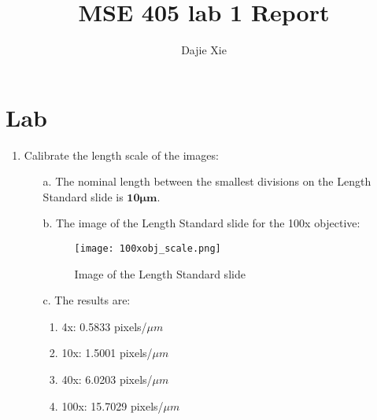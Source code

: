 \documentclass[12pt]{article}
\begin{document}
\title{\textbf{MSE 405 lab 1 Report}}
\author{Dajie Xie}

\maketitle

\section{Lab}

\begin{enumerate}
    \item Calibrate the length scale of the images:
    \begin{enumerate}
        \item[a.] The nominal length between the smallest divisions on the Length Standard slide is $\mathbf{10\bm{\mu} m}$. 
        
        \item[b.] The image of the Length Standard slide for the 100x objective:
        
        \begin{figure}[H]
            \centering
            \texttt{[image: 100xobj\_scale.png]}
            \caption{Image of the Length Standard slide}
            \label{fig:my_label}
        \end{figure}

        
        \item[c.]The results are:
        \begin{enumerate}
            \item 4x: 0.5833 pixels/$\mu m$
            \item 10x: 1.5001 pixels/$\mu m$
            \item 40x: 6.0203 pixels/$\mu m$
            \item 100x: 15.7029 pixels/$\mu m$
        \end{enumerate}
    \end{enumerate}
    
    \newpage
    

\end{enumerate}
\end{document}
